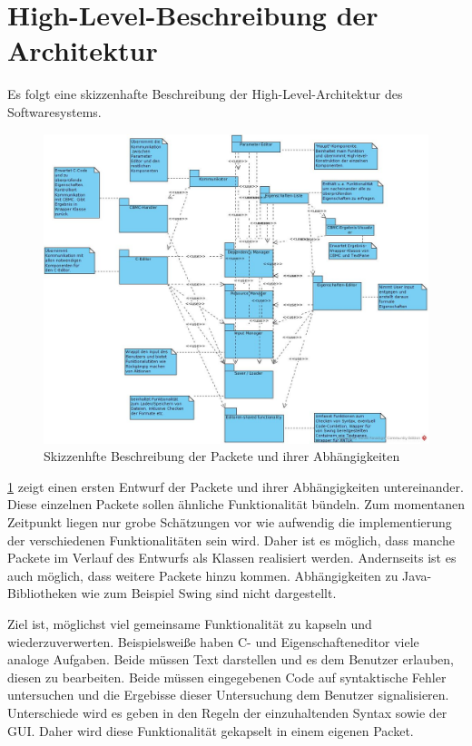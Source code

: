 \documentclass[a4paper]{scrreprt}
\begin{document}
\section{High-Level-Beschreibung der Architektur}	
Es folgt eine skizzenhafte Beschreibung der High-Level-Architektur des Softwaresystems. 

\begin{figure}[H]
\includegraphics[scale=0.4]{architecture_first_scetch.jpg}
\caption{Skizzenhfte Beschreibung der Packete und ihrer Abhängigkeiten}
\label{Packet-scetch}
\end{figure}

\ref{Packet-scetch} zeigt einen ersten Entwurf der Packete und ihrer Abhängigkeiten untereinander. Diese einzelnen Packete sollen ähnliche Funktionalität bündeln. Zum momentanen Zeitpunkt liegen nur grobe Schätzungen vor wie aufwendig die implementierung der verschiedenen Funktionalitäten sein wird. Daher ist es möglich, dass manche Packete im Verlauf des Entwurfs als Klassen realisiert werden. Andernseits ist es auch möglich, dass weitere Packete hinzu kommen. Abhängigkeiten zu Java-Bibliotheken wie zum Beispiel Swing sind nicht dargestellt.

Ziel ist, möglichst  viel gemeinsame Funktionalität zu kapseln und wiederzuverwerten. Beispielsweiße haben C- und Eigenschafteneditor viele analoge Aufgaben. Beide müssen Text darstellen und es dem Benutzer erlauben, diesen zu bearbeiten. Beide müssen eingegebenen Code auf syntaktische Fehler untersuchen und die Ergebisse dieser Untersuchung dem Benutzer signalisieren. Unterschiede wird es geben in den Regeln der einzuhaltenden Syntax sowie der \ac{GUI}. Daher wird diese Funktionalität gekapselt in einem eigenen Packet. 
\end{document}
